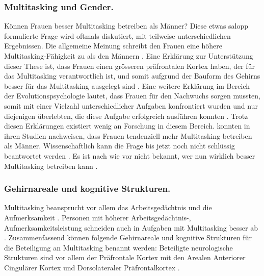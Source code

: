 \subsubsection{Multitasking und Gender.}
Können Frauen besser Multitasking betreiben als Männer? Diese etwas salopp formulierte Frage wird oftmals diskutiert, mit teilweise unterschiedlichen Ergebnissen. Die allgemeine Meinung schreibt den Frauen eine höhere Multitasking-Fähigkeit zu als den Männern \cite{Oconnell2002}. Eine Erklärung zur Unterstützung dieser These ist, dass Frauen einen grösseren präfrontalen Kortex haben, der für das Multitasking verantwortlich ist, und somit aufgrund der Bauform des Gehirns besser für das Multitasking ausgelegt sind \cite{Fisher2000}. Eine weitere Erklärung im Bereich der Evolutionspsychologie lautet, dass Frauen für den Nachwuchs sorgen mussten, somit mit einer Vielzahl unterschiedlicher Aufgaben konfrontiert wurden und nur diejenigen überlebten, die diese Aufgabe erfolgreich ausführen konnten \cite{Ellison2006}. Trotz diesen Erklärungen existiert wenig an Forschung in diesem Bereich.  konnten in ihren Studien nachweisen, dass Frauen tendenziell mehr Multitasking betreiben als Männer. Wissenschaftlich kann die Frage bis jetzt noch nicht schlüssig beantwortet werden \cite{Foehr2006}. Es ist nach wie vor nicht bekannt, wer nun wirklich besser Multitasking betreiben kann \cite{Mahany2005, Klingberg2008}. 
 
\subsubsection{Gehirnareale und kognitive Strukturen.} Multitasking beansprucht vor allem das Arbeitsgedächtnis und die Aufmerksamkeit \cite{Baethge2013}. Personen mit höherer Arbeitsgedächtnis-, Aufmerksamkeitsleistung schneiden auch in Aufgaben mit Multitasking besser ab \cite{Buhner2006}. Zusammenfassend können folgende Gehirnareale und kognitive Strukturen für die Beteiligung an Multitasking benannt werden: Beteiligte neurologische Strukturen sind vor allem der Präfrontale Kortex mit den Arealen Anteriorer Cingulärer Kortex und Dorsolateraler Präfrontalkortex \cite{Dreher2003}.

